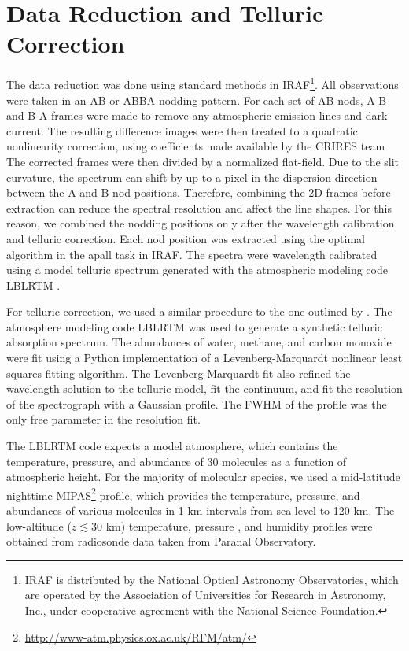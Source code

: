 \section{Data Reduction and Telluric Correction}
\label{paper1_sec:reduction}
The data reduction was done using standard methods in
IRAF\footnote{IRAF is distributed by the National Optical Astronomy Observatories,
    which are operated by the Association of Universities for Research
    in Astronomy, Inc., under cooperative agreement with the National
    Science Foundation.}. All observations were taken in an AB or ABBA nodding
pattern. For each set of AB nods, A-B and B-A frames were made to
remove any atmospheric emission lines and dark current. The resulting
difference images were then treated to a quadratic nonlinearity correction, using
coefficients made available by the CRIRES
team%
The corrected frames were then divided by a normalized flat-field. Due
to the slit curvature, the spectrum can shift by up to a pixel in
the dispersion direction between the A and B nod positions. Therefore,
combining the 2D frames before extraction can reduce the spectral
resolution and affect the line shapes. For this reason, we
combined the nodding positions only after the wavelength
calibration and telluric correction. Each nod position was extracted using the 
optimal algorithm in the apall task in IRAF. The spectra were wavelength 
calibrated using a model telluric
spectrum generated with the atmospheric modeling code
LBLRTM%
\citep{Clough2005}.


For telluric correction, we used a similar procedure to the one outlined by
\cite{Seifahrt2011}. The atmosphere modeling code
LBLRTM was used to generate a synthetic telluric
absorption spectrum. The abundances of water,
methane, and carbon monoxide were fit using a Python implementation of
a Levenberg-Marquardt nonlinear least squares fitting algorithm. The
Levenberg-Marquardt fit also refined the wavelength solution to the
telluric model, fit the continuum, and fit the resolution of the
spectrograph with a Gaussian profile. The FWHM of the profile was the
only free parameter in the resolution fit.

The LBLRTM code expects a model atmosphere, which contains the
temperature, pressure, and abundance of 30 molecules as a
function of atmospheric height. For the majority of molecular species,
we used a mid-latitude nighttime
MIPAS\footnote{\url{http://www-atm.physics.ox.ac.uk/RFM/atm/} }
profile, which provides the temperature, pressure, and abundances of
various molecules in 1 km intervals from sea level to 120 km. The
low-altitude ($z \lesssim 30$ km)
temperature, pressure \citep{Kerber2010}, and humidity
\citep{Chac2010} profiles were obtained from radiosonde data taken from Paranal Observatory.


